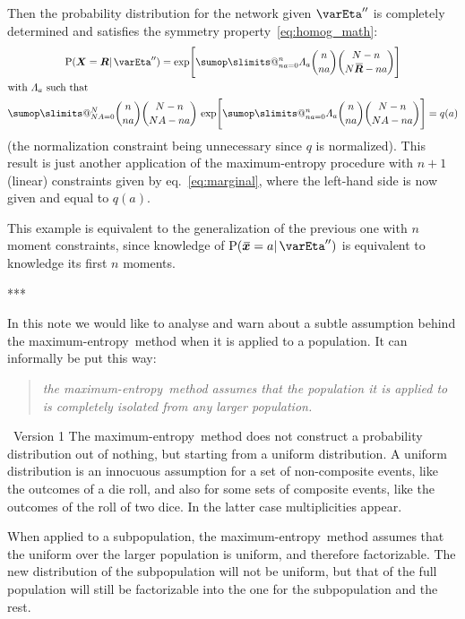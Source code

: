 \documentclass{article}
\makeatletter
\theoremstyle{remark}
\theoremstyle{innote}
\def\sum{\DOTSI\sumop\slimits@}
\renewcommand*{\|}{\mathpunct{|}}%
\newcommand*{\p}{\mathrm{P}}%
\newcommand*{\eqn}{eq.}%
\theoremstyle{simple}
\newcommand*{\puzzle}{{\fontencoding{U}\fontfamily{fontawesometwo}\selectfont\symbol{225}}}
\newcommand*{\mynote}[1]{ {\color{notecolour}\puzzle\ #1}}
\newcommand*{\widebar}[1]{{\mkern1.5mu\skew{2}\overline{\mkern-1.5mu#1\mkern-1.5mu}\mkern 1.5mu}}
\newcommand*{\av}{\widebar} %
\newcommand*{\sav}{\widebar} %
\newcommand*{\yxx}{x}%
\newcommand*{\yx}{\bm{\yxx}}%
\newcommand*{\yxs}{\sav{\yx}}%
\newcommand*{\yX}{\bm{X}}%
\newcommand*{\yXf}{\av{\yX}}%
\newcommand*{\yR}{\bm{R}}%
\newcommand*{\yRf}{\av{\yR}}%
\newcommand*{\yHb}{\varEta''}
\newcommand*{\yL}{\varLambda}
\newcommand*{\me}{maximum-entropy}
\makeatother
\begin{document}
\medskip Then the probability distribution for the network given $\yHb$ is
completely determined and satisfies the symmetry
property~\eqref{eq:homog_math}:
\begin{multline}
  \label{eq:pop_distr_maxent2}
  \p(\yX= \yR \|\yHb) =
\exp\Biggl[
\sum_{n a=0}^n \yL_{ a}
\binom{n}{n a}
\binom{N-n}{N\yRf-n a}\Biggr]
\\
\!\begin{aligned}[b]
&\text{with $\yL_{ a}$ such that}
\\
&\sum_{N A=0}^N 
\binom{n}{n a}
\binom{N-n}{N A-n a}\,
\exp\Biggl[
\sum_{n a=0}^n \yL_{ a}
\binom{n}{n a}
\binom{N-n}{N A-n a}\Biggr]
=q( a)
\end{aligned}
\end{multline}
(the normalization constraint being unnecessary since $q$ is normalized).
This result is just another application of the maximum-entropy procedure
with $n+1$ (linear) constraints given by \eqn~\eqref{eq:marginal}, where
the left-hand side is now given and equal to $q(a)$.

This example is equivalent to the generalization of the previous one with
$n$ moment constraints, since knowledge of $\p(\yxs=a \| \yHb)$ is
equivalent to knowledge its first $n$ moments.

***



In this note we would like to analyse and warn about a subtle assumption
behind the \me\ method when it is applied to a population. It can informally
be put this way:
\begin{quote}
  \emph{the \me\ method assumes that the population it is applied to is
    completely isolated from any larger population.}
\end{quote}

\mynote{Version 1}
The \me\ method does not construct a probability distribution out of
nothing, but starting from a uniform distribution. A uniform distribution
is an innocuous assumption for a set of non-composite events, like the
outcomes of a die roll, and also for some sets of composite events, like
the outcomes of the roll of two dice. In the latter case multiplicities
appear.

When applied to a subpopulation, the \me\ method assumes that the uniform over
the larger population is uniform, and therefore factorizable. The new
distribution of the subpopulation will not be uniform, but that of the full
population will still be factorizable into the one for the subpopulation and the
rest.
\end{document}
